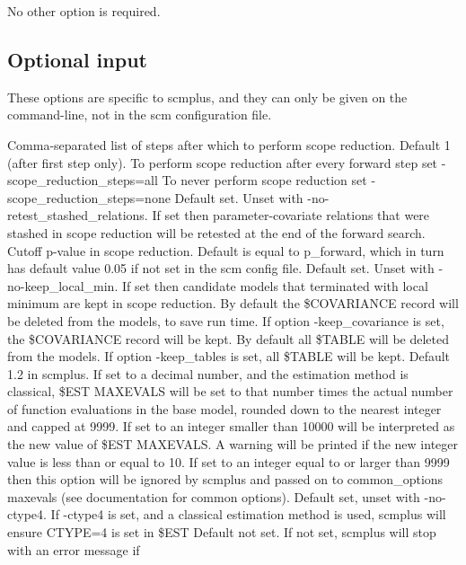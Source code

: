 \documentclass[hideglossary,notoc,hidelof,hidelot,hideTheSignaturePage,hideLinkCurrent,hideloa,pdfLatex,noClient,notitle,hideConfidential]{PMXstyle-20190820}
\begin{document}
No other option is required.

\subsection{Optional input}
These options are specific to scmplus, and they can only be given on the command-line, not in the
scm configuration file.

\begin{optionlist}
Comma-separated list of steps after which to perform scope reduction. Default 1 (after first step only).
To perform scope reduction after every forward step set -scope\_reduction\_steps=all 
To never perform scope reduction set -scope\_reduction\_steps=none 
\nextopt
{}
Default set. Unset with -no-retest\_stashed\_relations.
If set then parameter-covariate relations that were stashed
in scope reduction will be retested at the end of the forward search.
\nextopt
{}
Cutoff p-value in scope reduction. Default is equal to p\_forward,
which in turn has default value 0.05 if not set in the scm config file.
\nextopt
{}
Default set. Unset with -no-keep\_local\_min. If set then candidate models that
terminated with local minimum are kept in scope reduction.
By default the \$COVARIANCE record will be deleted from the models, to save run time.
If option -keep\_covariance is set, the \$COVARIANCE record will be kept.
\nextopt
{}
By default all \$TABLE will be deleted from the models.
If option -keep\_tables is set, all \$TABLE will be kept.
\nextopt
{}
Default 1.2 in scmplus. 
If set to a decimal number, and the estimation method is classical,
\$EST MAXEVALS will be set to that number times 
the actual number of function evaluations in the base model,
rounded down to the nearest integer and capped at 9999. 
If set to an integer smaller than 10000 will be interpreted as the new value
of \$EST MAXEVALS. A warning will be printed if the new integer value is 
less than or equal to 10. 
If set to an integer equal to or larger than 9999 then this option
will be ignored by scmplus and passed on to common\_options maxevals
(see documentation for common options).
Default set, unset with -no-ctype4.
If -ctype4 is set, and a classical estimation method is used,
scmplus will ensure CTYPE=4 is set in \$EST
\nextopt
{}
Default not set.
If not set, scmplus will stop with an error message if

\end{optionlist}
\end{document}
